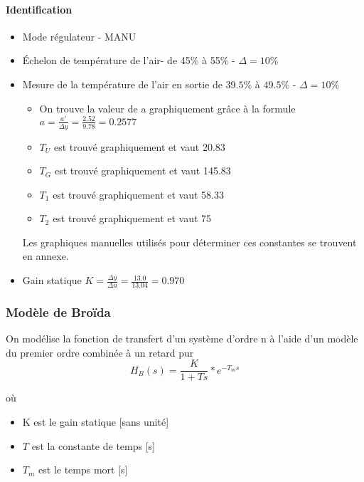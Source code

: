 \paragraph{Identification}
\begin{itemize}
\item Mode régulateur - MANU
\item Échelon de température de l'air- de 45\% à 55\% - $\Delta = 10\%$
\item Mesure de la température de l'air en sortie de $39.5\%$ à $49.5\%$ - $\Delta = 10\%$


\begin{itemize}
\item On trouve la valeur de a graphiquement grâce à la formule $a = \frac{a'}{\Delta y} = \frac{2.52}{9.78} = 0.2577$

\item $T_{U}$ est trouvé graphiquement et vaut 20.83 

\item $T_{G}$ est trouvé graphiquement et vaut 145.83

\item $T_{1}$ est trouvé graphiquement et vaut 58.33

\item $T_{2}$ est trouvé graphiquement et vaut 75
\end{itemize}

Les graphiques manuelles utilisés pour déterminer ces constantes se trouvent en annexe. 

\item Gain statique $K = \frac{\Delta y}{\Delta u} = \frac{13.0}{13.04} = 0.970 $
\end{itemize}

\subsubsection{Modèle de Broïda}
On modélise la fonction de transfert d'un système d'ordre n à l'aide d'un modèle du premier ordre combinée à un retard pur
\begin{equation}
H_{B}(s) = \frac{K}{1 + Ts}*e^{-T_{m}s}
\end{equation}

où 
\begin{itemize}
\item K est le gain statique [sans unité]
\item $T$ est la constante de temps [s]
\item $T_{m}$ est le temps mort [s]
\end{itemize}

